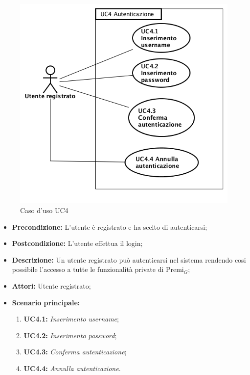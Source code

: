 \begin{figure}[h]
	\begin{center}
	\includegraphics[scale=0.4]{diagram/UC4.png}
	\caption{Caso d'uso UC4}
	\end{center}
\end{figure}
\begin{itemize}
	\item \textbf{Precondizione:} L'utente è registrato e ha scelto di autenticarsi;
	\item \textbf{Postcondizione:} L'utente effettua il login;
	\item \textbf{Descrizione:} Un utente registrato può autenticarsi nel sistema rendendo cosi possibile l'accesso a tutte le funzionalità private di Premi$_G$;
	\item \textbf{Attori:} Utente registrato;
	\item \textbf{Scenario principale:}
	\begin{enumerate}
		\item \textbf{ UC4.1:} \textit{ Inserimento username};
		\item \textbf{ UC4.2:} \textit{ Inserimento password};
		\item \textbf{ UC4.3:} \textit{ Conferma autenticazione};
		\item \textbf{ UC4.4:} \textit{ Annulla autenticazione}.
	\end{enumerate}
\end{itemize}
